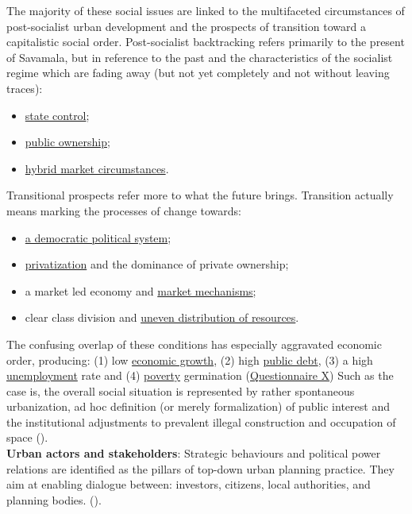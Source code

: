\documentclass[11pt]{report}
\begin{document}
{{{{\begin{itemize}
The majority of these social issues are linked to the multifaceted circumstances of post-socialist urban development and the prospects of transition toward a capitalistic social order. Post-socialist backtracking refers primarily to the present of Savamala, but in reference to the past and the characteristics of the socialist regime which are fading away (but not yet completely and not without leaving traces):

\begin{itemize}
\item \underline{state control};
\item \underline{public ownership};
\item \underline{hybrid market circumstances}.
\end{itemize}

Transitional prospects refer more to what the future brings. Transition actually means marking the processes of change towards:

\begin{itemize}
\item \underline{a democratic political system};
\item \underline{privatization} and the dominance of private ownership;
\item a market led economy and \underline{market mechanisms};
\item clear class division and \underline{uneven distribution of resources}.
\end{itemize}

The confusing overlap of these conditions has especially aggravated economic order, producing:
(1) low \underline{economic growth},
(2) high \underline{public debt},
(3) a high \underline{unemployment} rate
and
(4) \underline{poverty} germination (\href{Questionnaire Experts Post-socialist}{Questionnaire X})
Such as the case is, the overall social situation is represented by rather spontaneous urbanization, ad hoc definition (or merely formalization) of public interest and the institutional adjustments to prevalent illegal construction and occupation of space (\href{ref}{\citealt{ministarstvo_prostora_urbani_2014}}).
\\

\textbf{Urban actors and stakeholders}:
Strategic behaviours and political power relations are identified as the pillars of top-down urban planning practice.
They aim at enabling dialogue between: investors, citizens, local authorities, and planning bodies.
(\href{Vujosevic}{\citealt{vujosevic_problem_2006}}).


\end{itemize}}}}}
\end{document}
